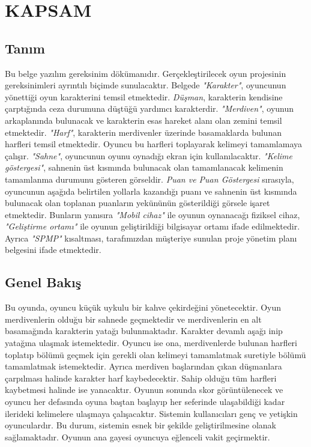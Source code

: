 \documentclass[12pt,a4paper]{article}
\begin{document}
   
   \newpage

   \tableofcontents
   \newpage


   \section{KAPSAM}
   \subsection{Tanım} \label{kaps}
   Bu belge yazılım gereksinim dökümanıdır. Gerçekleştirilecek oyun projesinin gereksinimleri ayrıntılı biçimde sunulacaktır. Belgede \textit{"Karakter"}, oyuncunun yönettiği oyun karakterini temsil etmektedir. \textit{Düşman}, karakterin kendisine çarptığında ceza durumuna düştüğü yardımcı karakterdir. \textit{"Merdiven"}, oyunun arkaplanında bulunacak ve karakterin esas hareket alanı olan zemini temsil etmektedir. \textit{"Harf"}, karakterin merdivenler üzerinde basamaklarda bulunan harfleri temsil etmektedir. Oyuncu bu harfleri toplayarak kelimeyi tamamlamaya çalışır. \textit{"Sahne"}, oyuncunun oyunu oynadığı ekran için kullanılacaktır. \textit{"Kelime göstergesi"}, sahnenin üst kısmında bulunacak olan tamamlanacak kelimenin tamamlanma durumunu gösteren görseldir. \textit{Puan ve Puan Göstergesi} sırasıyla, oyuncunun aşağıda belirtilen yollarla kazandığı puanı ve sahnenin üst kısmında bulunacak olan toplanan puanların yekününün gösterildiği görsele işaret etmektedir. Bunların yanısıra \textit{"Mobil cihaz"} ile oyunun oynanacağı fiziksel cihaz, \textit{"Geliştirme ortamı"} ile oyunun geliştirildiği bilgisayar ortamı ifade edilmektedir. Ayrıca \textit{"SPMP"} kısaltması, tarafımızdan müşteriye sunulan proje yönetim planı belgesini ifade etmektedir.

   \subsection{Genel Bakış} \label{genel}
   Bu oyunda, oyuncu küçük uykulu bir kahve çekirdeğini yönetecektir. Oyun merdivenlerin olduğu bir sahnede geçmektedir ve merdivenlerin en alt basamağında karakterin yatağı bulunmaktadır. Karakter devamlı aşağı inip yatağına ulaşmak istemektedir. Oyuncu ise ona, merdivenlerde bulunan harfleri toplatıp bölümü geçmek için gerekli olan kelimeyi tamamlatmak suretiyle bölümü tamamlatmak istemektedir. Ayrıca merdiven başlarından çıkan düşmanlara çarpılması halinde karakter harf kaybedecektir. Sahip olduğu tüm harfleri kaybetmesi halinde ise yanacaktır. Oyunun sonunda skor görüntülenecek ve oyuncu her defasında oyuna baştan başlayıp her seferinde ulaşabildiği kadar ilerideki kelimelere ulaşmaya çalışacaktır.
   Sistemin kullanıcıları genç ve yetişkin oyunculardır. Bu durum, sistemin esnek bir şekilde geliştirilmesine olanak sağlamaktadır. Oyunun ana gayesi oyuncuya eğlenceli vakit geçirmektir.
\end{document}
